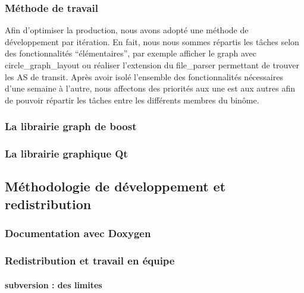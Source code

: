 \subsubsection{Méthode de travail}

Afin d'optimiser la production, nous avons adopté une méthode de développement par itération. En fait, nous nous sommes répartis les tâches selon des fonctionnalités ``élémentaires'', par exemple afficher le graph avec circle_graph_layout ou réaliser l'extension du file_parser permettant de trouver les AS de transit. Après avoir isolé l'ensemble des fonctionnalités nécessaires d'une semaine à l'autre, nous affectons des priorités aux une est aux autres afin de pouvoir répartir les tâches entre les différents membres du binôme.

\subsubsection{La librairie graph de boost}



\subsubsection{La librairie graphique Qt}


\subsection{Méthodologie de développement et redistribution}
\subsubsection{Documentation avec Doxygen}


\subsubsection{Redistribution et travail en équipe}
\paragraph{subversion : des limites}

